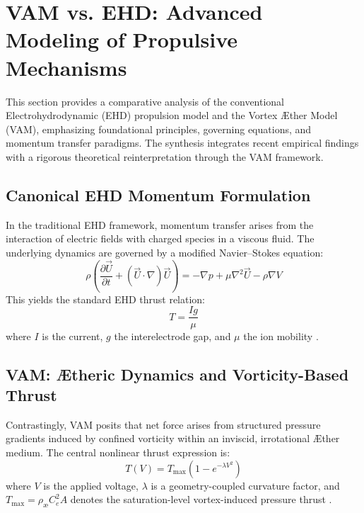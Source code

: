 \documentclass[a4paper,12pt]{article}
\begin{document}

\section{VAM vs. EHD: Advanced Modeling of Propulsive Mechanisms}


This section provides a comparative analysis of the conventional Electrohydrodynamic (EHD) propulsion model and the Vortex Æther Model (VAM), emphasizing foundational principles, governing equations, and momentum transfer paradigms. The synthesis integrates recent empirical findings \cite{ehdreview2023} \cite{ehdpropeller2023} \cite{electricfluidsetup2023} \cite{ehdmodeling2023} with a rigorous theoretical reinterpretation through the VAM framework.


\subsection{Canonical EHD Momentum Formulation}
In the traditional EHD framework, momentum transfer arises from the interaction of electric fields with charged species in a viscous fluid. The underlying dynamics are governed by a modified Navier--Stokes equation:
\begin{equation}
\rho \left( \frac{\partial \vec{U}}{\partial t} + (\vec{U} \cdot \nabla)\vec{U} \right) = -\nabla p + \mu \nabla^2 \vec{U} - \rho \nabla V
\end{equation}
This yields the standard EHD thrust relation:
\begin{equation}
T = \frac{I g}{\mu}
\end{equation}
where $I$ is the current, $g$ the interelectrode gap, and $\mu$ the ion mobility \cite{ehdreview2023}.


\subsection{VAM: Ætheric Dynamics and Vorticity-Based Thrust}
Contrastingly, VAM posits that net force arises from structured pressure gradients induced by confined vorticity within an inviscid, irrotational Æther medium. The central nonlinear thrust expression is:
\begin{equation}
T(V) = T_\text{max}(1 - e^{-\lambda V^2})
\end{equation}
where $V$ is the applied voltage, $\lambda$ is a geometry-coupled curvature factor, and $T_\text{max} = \rho_\text{\ae} C_e^2 A$ denotes the saturation-level vortex-induced pressure thrust \cite{vamderive2024}.
\end{document}
